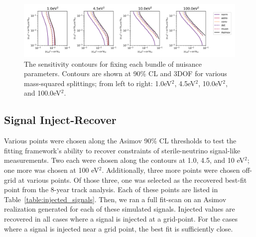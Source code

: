 \documentclass[main.tex]{subfiles}
\begin{document}
\begin{figure}
    \centering
    \includegraphics[width=0.90\linewidth]{figures/systematic_impact_joint.png}
    \caption{The sensitivity contours for fixing each bundle of nuisance parameters. Contours are shown at 90\% CL and 3DOF for various mass-squared splittings; from left to right: 1.0eV$^{2}$, 4.5eV$^{2}$, 10.0eV$^{2}$, and 100.0eV$^{2}$.}\label{fig:impact}
\end{figure}

\subsection{Signal Inject-Recover}

Various points were chosen along the Asimov 90\% CL thresholds to test the fitting framework's ability to recover constraints of sterile-neutrino signal-like measurements. 
Two each were chosen along the contours at 1.0, 4.5, and 10 eV$^{2}$; one more was chosen at 100 eV$^{2}$. 
Additionally, three more points were chosen off-grid at various points.
Of those three, one was selected as the recovered best-fit point from the 8-year track analysis. 
Each of these points are listed in Table~\ref{table:injected_signals}.
Then, we ran a full fit-scan on an Asimov realization generated for each of these simulated signals. 
Injected values are recovered in all cases where a signal is injected at a grid-point. 
For the cases where a signal is injected near a grid point, the best fit is sufficiently close.
\end{document}
